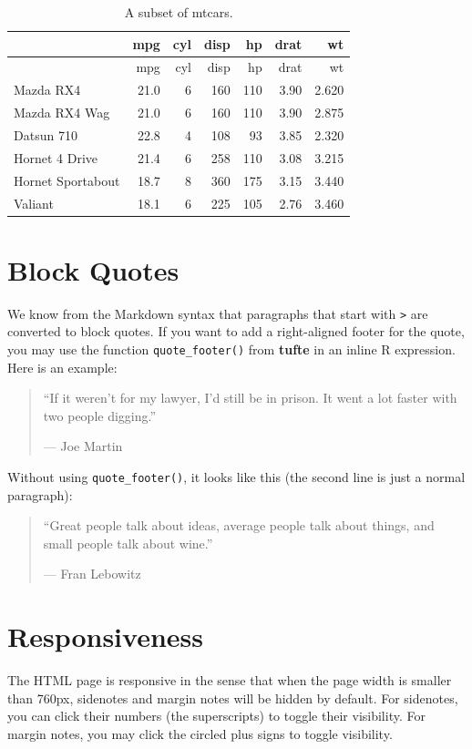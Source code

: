 \documentclass[]{tufte-book}
\begin{document}
\begin{longtable}[]{@{}lrrrrrr@{}}
\caption{A subset of mtcars.}\tabularnewline
\toprule
& mpg & cyl & disp & hp & drat & wt\tabularnewline
\midrule
\endfirsthead
\toprule
& mpg & cyl & disp & hp & drat & wt\tabularnewline
\midrule
\endhead
Mazda RX4 & 21.0 & 6 & 160 & 110 & 3.90 & 2.620\tabularnewline
Mazda RX4 Wag & 21.0 & 6 & 160 & 110 & 3.90 & 2.875\tabularnewline
Datsun 710 & 22.8 & 4 & 108 & 93 & 3.85 & 2.320\tabularnewline
Hornet 4 Drive & 21.4 & 6 & 258 & 110 & 3.08 & 3.215\tabularnewline
Hornet Sportabout & 18.7 & 8 & 360 & 175 & 3.15 & 3.440\tabularnewline
Valiant & 18.1 & 6 & 225 & 105 & 2.76 & 3.460\tabularnewline
\bottomrule
\end{longtable}

\hypertarget{block-quotes}{%
\chapter{Block Quotes}\label{block-quotes}}

We know from the Markdown syntax that paragraphs that start with
\texttt{\textgreater{}} are converted to block quotes. If you want to
add a right-aligned footer for the quote, you may use the function
\texttt{quote\_footer()} from \textbf{tufte} in an inline R expression.
Here is an example:

\begin{quote}
``If it weren't for my lawyer, I'd still be in prison. It went a lot
faster with two people digging.''

\hfill --- Joe Martin
\end{quote}

Without using \texttt{quote\_footer()}, it looks like this (the second
line is just a normal paragraph):

\begin{quote}
``Great people talk about ideas, average people talk about things, and
small people talk about wine.''

--- Fran Lebowitz
\end{quote}

\hypertarget{responsiveness}{%
\chapter{Responsiveness}\label{responsiveness}}

The HTML page is responsive in the sense that when the page width is
smaller than 760px, sidenotes and margin notes will be hidden by
default. For sidenotes, you can click their numbers (the superscripts)
to toggle their visibility. For margin notes, you may click the circled
plus signs to toggle visibility.
\end{document}
